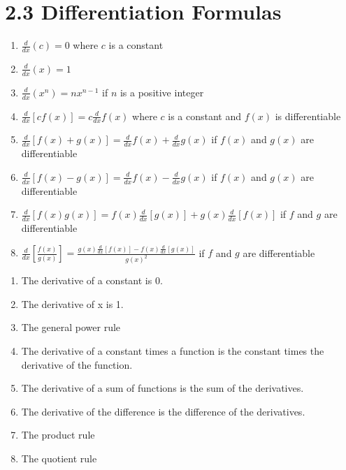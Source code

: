 %
%

\section*{2.3 Differentiation Formulas}

\begin{enumerate}
    \item \(\frac{d}{dx}(c)=0\) \quad where \(c\) is a constant
    \item \(\frac{d}{dx}(x)=1\)
    \item \(\frac{d}{dx}(x^n)=nx^{n-1}\) \quad if \(n\) is a positive integer
    \item \(\frac{d}{dx}[cf(x)]=c\frac{d}{dx}f(x)\) \quad where \(c\) is a constant and \(f(x)\) is differentiable
    \item \(\frac{d}{dx}[f(x)+g(x)]=\frac{d}{dx}f(x)+\frac{d}{dx}g(x)\) \quad if \(f(x)\) and \(g(x)\) are differentiable
    \item \(\frac{d}{dx}[f(x)-g(x)]=\frac{d}{dx}f(x)-\frac{d}{dx}g(x)\) \quad if \(f(x)\) and \(g(x)\) are differentiable
    \item \(\frac{d}{dx}[f(x)g(x)]=f(x)\frac{d}{dx}[g(x)]+g(x)\frac{d}{dx}[f(x)]\) \quad if \(f\) and \(g\) are differentiable
    \item \(\frac{d}{dx}[\frac{f(x)}{g(x)}]=\frac{g(x)\frac{d}{dx}[f(x)]-f(x)\frac{d}{dx}[g(x)]}{g(x)^2}\) \quad if \(f\) and \(g\) are differentiable
\end{enumerate}
\begin{enumerate}
    \item The derivative of a constant is 0.
    \item The derivative of x is 1.
    \item The general power rule
    \item The derivative of a constant times a function is the constant times the derivative of the function.
    \item The derivative of a sum of functions is the sum of the derivatives.
    \item The derivative of the difference is the difference of the derivatives.
    \item The product rule
    \item The quotient rule
\end{enumerate}
